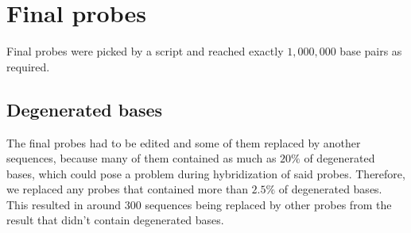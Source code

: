 \section{Final probes}

Final probes were picked by a script and reached exactly $1,000,000$ base pairs as required. 

\subsection{Degenerated bases}

The final probes had to be edited and some of them replaced by another sequences, because many of them contained as much as $20\%$ of degenerated bases, which could pose a problem during hybridization of said probes. 
Therefore, we replaced any probes that contained more than $2.5\%$ of degenerated bases. This resulted in around $300$ sequences being replaced by other probes from the result that didn't contain degenerated bases. 


